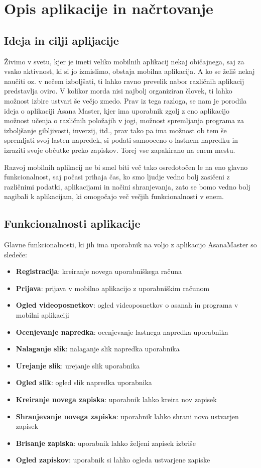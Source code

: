 \documentclass[a4paper, 12pt]{book}
\begin{document}
\chapter{Opis aplikacije in načrtovanje}
\label{ch1}

\section{Ideja in cilji aplijacije}
Živimo v svetu, kjer je imeti veliko mobilnih aplikacij nekaj običajnega, saj za vsako aktivnost, ki si jo izmislimo, obstaja mobilna aplikacija. A ko se želiš nekaj naučiti oz. v nečem izboljšati, ti lahko ravno prevelik nabor različnih aplikacij predstavlja oviro. V kolikor morda nisi najbolj organiziran človek, ti lahko možnost izbire ustvari še večjo zmedo. Prav iz tega razloga, se nam je porodila ideja o aplikaciji Asana Master, kjer ima uporabnik zgolj z eno aplikacijo možnost učenja o različnih položajih v jogi, možnost spremljanja programa za izboljšanje gibljivosti, inverzij, itd., prav tako pa ima možnost ob tem še spremljati svoj lasten napredek, si podati samooceno o lastnem napredku in izraziti svoje občutke preko zapiskov. Torej vse zapakirano na enem mestu.

Razvoj mobilnih aplikacij ne bi smel biti več tako osredotočen le na eno glavno funkcionalnost, saj počasi prihaja čas, ko smo ljudje vedno bolj zasičeni z različnimi podatki, aplikacijami in načini shranjevanja, zato se bomo vedno bolj nagibali k aplikacijam, ki omogočajo več večjih funkcionalnosti v enem.

\section{Funkcionalnosti aplikacije}
Glavne funkcionalnosti, ki jih ima uporabnik na voljo z aplikacijo AsanaMaster so sledeče:

 \begin{itemize}
  \item \textbf{Registracija}: kreiranje novega uporabniškega računa
  \item \textbf{Prijava}: prijava v mobilno aplikacijo z uporabniškim računom
  \item \textbf{Ogled videoposnetkov}: ogled videoposnetkov o asanah in programa v mobilni aplikaciji
  \item \textbf{Ocenjevanje napredka}: ocenjevanje lastnega napredka uporabnika
  \item \textbf{Nalaganje slik}: nalaganje slik napredka uporabnika
  \item \textbf{Urejanje slik}: urejanje slik uporabnika
  \item \textbf{Ogled slik}: ogled slik napredka uporabnika
  \item \textbf{Kreiranje novega zapiska}: uporabnik lahko kreira nov zapisek
  \item \textbf{Shranjevanje novega zapiska}: uporabnik lahko shrani novo ustvarjen zapisek
  \item \textbf{Brisanje zapiska}: uporabnik lahko željeni zapisek izbriše
  \item \textbf{Ogled zapiskov}: uporabnik si lahko ogleda ustvarjene zapiske
\end{itemize}
\end{document}
